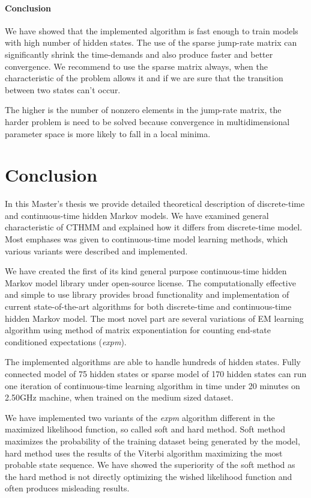 \documentclass[thesis=M,english]{FITthesis}[2012/10/20]
\begin{document}
\subsubsection*{ Conclusion }

We have showed that the implemented algorithm is fast enough to train models with high number of hidden states. The use of the sparse jump-rate matrix can significantly shrink the time-demands and also produce faster and better convergence. We recommend to use the sparse matrix always, when the characteristic of the problem allows it and if we are sure that the transition between two states can't occur. 

The higher is the number of nonzero elements in the jump-rate matrix, the harder problem is need to be solved because convergence in multidimensional parameter space is more likely to fall in a local minima.  

\chapter{Conclusion}

In this Master's thesis we provide detailed theoretical description of discrete-time and continuous-time hidden Markov models. We have examined general characteristic of CTHMM and explained how it differs from discrete-time model. Most emphases was given to continuous-time model learning methods, which various variants were described and implemented.   

We have created the first of its kind general purpose continuous-time hidden Markov model library under open-source license. The computationally effective and simple to use library provides broad functionality and implementation of current state-of-the-art algorithms for both discrete-time and continuous-time hidden Markov model. The most novel part are several variations of EM learning algorithm using method of matrix exponentiation for counting end-state conditioned expectations (\textit{expm}).

The implemented algorithms are able to handle hundreds of hidden states.  Fully connected model of 75 hidden states or sparse model of 170 hidden states can run one iteration of continuous-time learning algorithm in time under 20 minutes on 2.50GHz machine, when trained on the medium sized dataset.  

We have implemented two variants of the \textit{expm} algorithm different in the maximized likelihood function, so called soft and hard method. Soft method maximizes the probability of the training dataset being generated by the model, hard method uses the results of the Viterbi algorithm maximizing the most probable state sequence. We have showed the superiority of the soft method as the hard method is not directly optimizing the wished likelihood function and often produces misleading results.
\end{document}
